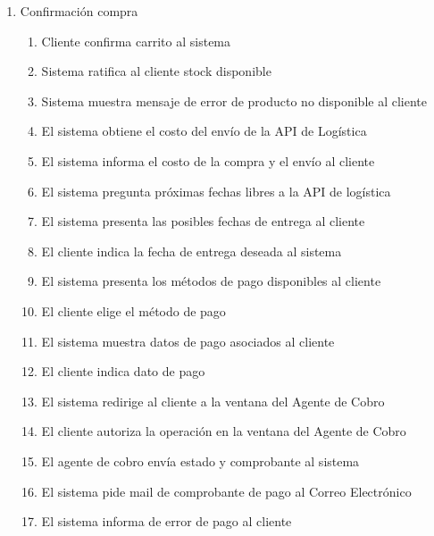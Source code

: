\begin{enumerate}
\item Confirmación compra
  \begin{enumerate}
    \item Cliente confirma carrito al sistema \label{itm:f-cliente-confirma-carrito-sistema}
    \item Sistema ratifica al cliente stock disponible \label{itm:f-sistema-confirma-stock-cliente}
    \item Sistema muestra mensaje de error de producto no disponible al cliente \label{itm:f-sistema-error-stock-cliente}
    \item El sistema obtiene el costo del envío de la API de Logística \label{itm:f-apilogistica-envia-costo-sistema}
    \item El sistema informa el costo de la compra y el envío al cliente \label{itm:f-sistema-envia-costo-cliente}
    \item El sistema pregunta próximas fechas libres a la API de logística \label{itm:f-apilogistica-fechas-libres-sistema}
    \item El sistema presenta las posibles fechas de entrega al cliente \label{itm:f-sistema-fechas-libres-cliente}
    \item El cliente indica la fecha de entrega deseada al sistema \label{itm:f-cliente-fecha-entrega-sistema}
    \item El sistema presenta los métodos de pago disponibles al cliente \label{itm:f-sistema-muestra-metodos-pago-cliente}
    \item El cliente elige el método de pago \label{itm:f-cliente-elige-metodo-pago-sistema}
    \item El sistema muestra datos de pago asociados al cliente \label{itm:f-sistema-muestra-datos-pago-cliente}
    \item El cliente indica dato de pago \label{itm:f-cliente-elige-dato-pago-sistema}
    \item El sistema redirige al cliente a la ventana del Agente de Cobro \label{itm:f-sistema-redirige-cliente}
    \item El cliente autoriza la operación en la ventana del Agente de Cobro \label{itm:f-cliente-autoriza-agentecobro}
    \item El agente de cobro envía estado y comprobante al sistema \label{itm:f-agentecobro-comprobante-sistema}
    \item El sistema pide mail de comprobante de pago al Correo Electrónico \label{itm:f-sistema-envia-comprobante-correoelectronico}
    \item El sistema informa de error de pago al cliente \label{itm:f-sistema-error-pago-cliente}

\end{enumerate}
\end{enumerate}
